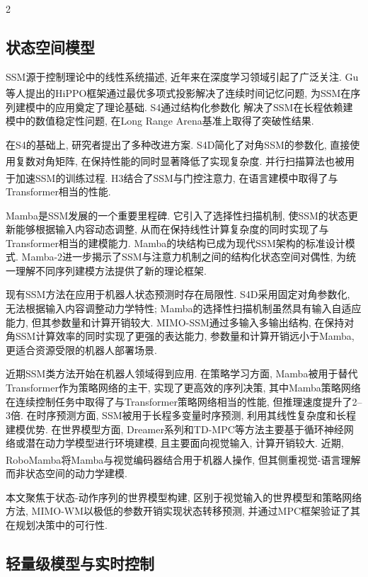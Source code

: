 \begin{multicols}{2}
\subsection{状态空间模型}

SSM源于控制理论中的线性系统描述,
近年来在深度学习领域引起了广泛关注.
Gu等人\textsuperscript{\cite{20}}提出的HiPPO框架通过最优多项式投影解决了连续时间记忆问题,
为SSM在序列建模中的应用奠定了理论基础.
S4通过结构化参数化
解决了SSM在长程依赖建模中的数值稳定性问题,
在Long Range Arena基准上取得了突破性结果.

在S4的基础上, 研究者提出了多种改进方案.
S4D简化了对角SSM的参数化, 直接使用复数对角矩阵,
在保持性能的同时显著降低了实现复杂度.
并行扫描算法\textsuperscript{\cite{21}}也被用于加速SSM的训练过程.
H3\textsuperscript{\cite{22}}结合了SSM与门控注意力, 在语言建模中取得了与Transformer相当的性能.

Mamba是SSM发展的一个重要里程碑.
它引入了选择性扫描机制, 使SSM的状态更新能够根据输入内容动态调整,
从而在保持线性计算复杂度的同时实现了与Transformer相当的建模能力.
Mamba的块结构已成为现代SSM架构的标准设计模式.
Mamba-2进一步揭示了SSM与注意力机制之间的结构化状态空间对偶性,
为统一理解不同序列建模方法提供了新的理论框架.

现有SSM方法在应用于机器人状态预测时存在局限性.
S4D采用固定对角参数化, 无法根据输入内容调整动力学特性;
Mamba的选择性扫描机制虽然具有输入自适应能力, 但其参数量和计算开销较大.
MIMO-SSM通过多输入多输出结构, 在保持对角SSM计算效率的同时实现了更强的表达能力,
参数量和计算开销远小于Mamba, 更适合资源受限的机器人部署场景.

近期SSM类方法开始在机器人领域得到应用.
在策略学习方面, Mamba被用于替代Transformer作为策略网络的主干, 实现了更高效的序列决策,
其中Mamba策略网络在连续控制任务中取得了与Transformer策略网络相当的性能,
但推理速度提升了2--3倍.
在时序预测方面, SSM被用于长程多变量时序预测, 利用其线性复杂度和长程建模优势.
在世界模型方面, Dreamer系列和TD-MPC等方法主要基于循环神经网络或潜在动力学模型进行环境建模,
且主要面向视觉输入, 计算开销较大.
近期, RoboMamba\textsuperscript{\cite{23}}将Mamba与视觉编码器结合用于机器人操作,
但其侧重视觉-语言理解而非状态空间的动力学建模.

本文聚焦于状态-动作序列的世界模型构建, 区别于视觉输入的世界模型和策略网络方法,
MIMO-WM以极低的参数开销实现状态转移预测, 并通过MPC框架验证了其在规划决策中的可行性.

\subsection{轻量级模型与实时控制}


\end{multicols}
